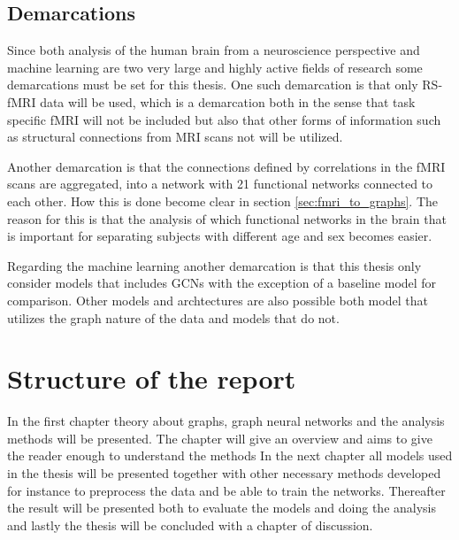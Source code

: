 \subsection{Demarcations}
Since both analysis of the human brain from a neuroscience perspective and machine learning are two very large and highly active fields of research some demarcations must be set for this thesis. One such demarcation is that only RS-fMRI data will be used, which is a demarcation both in the sense that task specific fMRI will not be included but also that other forms of information such as structural connections from MRI scans not will be utilized. 

Another demarcation is that the connections defined by correlations in the fMRI scans are aggregated, into a network with 21 functional networks connected to each other. How this is done become clear in section \ref{sec:fmri_to_graphs}. The reason for this is that the analysis of which functional networks in the brain that is important for separating subjects with different age and sex becomes easier. 

Regarding the machine learning another demarcation is that this thesis only consider models that includes GCNs with the exception of a baseline model for comparison. Other models and archtectures are also possible both model that utilizes the graph nature of the data and models that do not.



\section{Structure of the report}
In the first chapter theory about graphs, graph neural networks and the analysis methods will be presented.
The chapter will give an overview and aims to give the reader enough to understand the methods
In the next chapter all models used in the thesis will be presented together with other necessary methods developed for instance to preprocess the data
and be able to train the networks. Thereafter the result will be presented both to evaluate the models and doing the analysis and lastly the thesis will be concluded with a chapter of discussion. 

